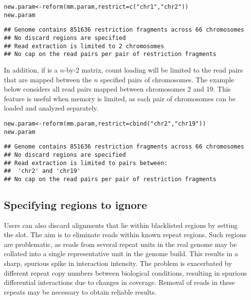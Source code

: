 \documentclass{report}\usepackage[]{graphicx}\usepackage[usenames,dvipsnames]{color}
\newcommand{\hlstr}[1]{\textcolor[rgb]{0.251,0.627,0.251}{#1}}%
\newcommand{\hlstd}[1]{\textcolor[rgb]{0.251,0.251,0.251}{#1}}%
\newcommand{\hlkwb}[1]{\textcolor[rgb]{0,0,0}{#1}}%
\newcommand{\hlkwc}[1]{\textcolor[rgb]{0.251,0.251,0.251}{#1}}%
\newcommand{\hlkwd}[1]{\textcolor[rgb]{0.878,0.439,0.125}{#1}}%
\newenvironment{knitrout}{}{} %
\begin{document}
\begin{knitrout}
\color{fgcolor}\begin{kframe}
\begin{alltt}
\hlstd{new.param} \hlkwb{<-} \hlkwd{reform}\hlstd{(mm.param,} \hlkwc{restrict}\hlstd{=}\hlkwd{c}\hlstd{(}\hlstr{"chr1"}\hlstd{,} \hlstr{"chr2"}\hlstd{))}
\hlstd{new.param}
\end{alltt}
\begin{verbatim}
## Genome contains 851636 restriction fragments across 66 chromosomes
## No discard regions are specified
## Read extraction is limited to 2 chromosomes
## No cap on the read pairs per pair of restriction fragments
\end{verbatim}
\end{kframe}
\end{knitrout}

In addition, if  is a $n$-by-2 matrix, count loading will be limited to the read pairs that are mapped between the $n$ specified pairs of chromosomes.
The example below considers all read pairs mapped between chromosomes 2 and 19.
This feature is useful when memory is limited, as each pair of chromosomes can be loaded and analyzed separately.

\begin{knitrout}
\color{fgcolor}\begin{kframe}
\begin{alltt}
\hlstd{new.param} \hlkwb{<-} \hlkwd{reform}\hlstd{(mm.param,} \hlkwc{restrict}\hlstd{=}\hlkwd{cbind}\hlstd{(}\hlstr{"chr2"}\hlstd{,} \hlstr{"chr19"}\hlstd{))}
\hlstd{new.param}
\end{alltt}
\begin{verbatim}
## Genome contains 851636 restriction fragments across 66 chromosomes
## No discard regions are specified
## Read extraction is limited to pairs between:
## 	'chr2' and 'chr19'
## No cap on the read pairs per pair of restriction fragments
\end{verbatim}
\end{kframe}
\end{knitrout}

\subsection{Specifying regions to ignore}
Users can also discard alignments that lie within blacklisted regions by setting the  slot.
The aim is to eliminate reads within known repeat regions.
Such regions are problematic, as reads from several repeat units in the real genome may be collated into a single representative unit in the genome build.
This results in a sharp, spurious spike in interaction intensity.
The problem is exacerbated by different repeat copy numbers between biological conditions, resulting in spurious differential interactions due to changes in coverage.
Removal of reads in these repeats may be necessary to obtain reliable results.
\end{document}

